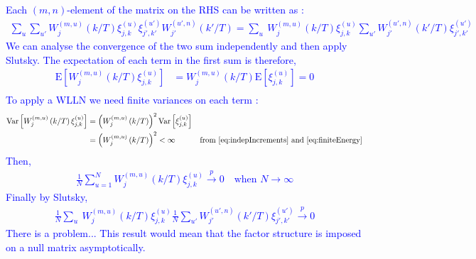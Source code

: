 \documentclass{article}
\numberwithin{equation}{section}
\let \oldsum \sum
\renewcommand{\sum}{\displaystyle \oldsum}
\newcommand{\eW}[4]{W_{#3}^{(#1,#2)}\left(#4/T\right)}
\newcommand{\eincrement}[3]{\xi_{#2,#3}^{(#1)}}
\newcommand{\E}[1]{\mathrm{E}\left[#1\right]}
\newcommand{\Var}[1]{\mathrm{Var}\left[#1\right]}
\begin{document}
	\textcolor{blue}{
	Each $(m,n)$-element of the matrix on the RHS can be written as : 
	\begin{align*}
		\sum_{u}\sum_{u'} \eW{m}{u}{j}{k}\eincrement{u}{j}{k}\eincrement{u'}{j'}{k'}\eW{u'}{n}{j'}{k'} = \sum_{u}\ \eW{m}{u}{j}{k}\eincrement{u}{j}{k} \sum_{u'}\eW{u'}{n}{j'}{k'} \eincrement{u'}{j'}{k'}
	\end{align*}
	We can analyse the convergence of the two sum independently and then apply Slutsky. 
	The expectation of each term in the first sum is therefore, 
	\begin{align*}
		\E{\eW{m}{u}{j}{k}\eincrement{u}{j}{k}} &= \eW{m}{u}{j}{k}\E{\eincrement{u}{j}{k}} = 0\\
	\end{align*}
	To apply a WLLN we need finite variances on each term :  
	\begin{align*}
		\Var{\eW{m}{u}{j}{k}\eincrement{u}{j}{k}} &= \left(\eW{m}{u}{j}{k}\right)^{2}\Var{\eincrement{u}{j}{k}}\\
								        &= \left(\eW{m}{u}{j}{k}\right)^{2} < \infty \quad &\text{from }\eqref{eq:indepIncrements} \text{ and }\eqref{eq:finiteEnergy}
	\end{align*}
	Then, 
	\begin{align*}
		\frac{1}{N} \sum_{u=1}^{N} \eW{m}{u}{j}{k}\eincrement{u}{j}{k} \overset{p}{\longrightarrow} 0 \quad \text{when } N \longrightarrow \infty
	\end{align*}
	Finally by Slutsky, 
	\begin{align*}
		\frac{1}{N}\sum_{u}\ \eW{m}{u}{j}{k}\eincrement{u}{j}{k} \frac{1}{N}\sum_{u'}\eW{u'}{n}{j'}{k'} \eincrement{u'}{j'}{k'} \overset{p}{\longrightarrow} 0
	\end{align*}
	\textcolor{blue}{There is a problem... This result would mean that the factor structure is imposed on a null matrix asymptotically. }}
\end{document}
